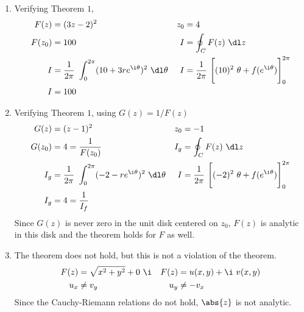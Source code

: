\begin{enumerate}
    \item Verifying Theorem $ 1 $,
          \begin{align}
              F(z)   & = (3z - 2)^2                                              &
              z_0    & = 4                                                         \\
              F(z_0) & = 100                                                     &
              I      & = \oint_C F(z)\ \dl z                                       \\
              I      & = \frac{1}{2\pi}\ \int_{0}^{2\pi}
              (10 + 3re^{\i \theta})^2\ \dl \theta
                     &
              I      & = \frac{1}{2\pi}\ \Bigg[ (10)^2\ \theta + f(e^{\i\theta})
              \Bigg]_0^{2\pi}                                                      \\
              I      & = 100
          \end{align}

    \item Verifying Theorem $ 1 $, using $ G(z)  = 1/F(z)$
          \begin{align}
              G(z)   & = (z - 1)^2                                               &
              z_0    & = -1                                                        \\
              G(z_0) & = 4 = \frac{1}{F(z_0)}                                    &
              I_g    & = \oint_C F(z)\ \dl z                                       \\
              I_g    & = \frac{1}{2\pi}\ \int_{0}^{2\pi}
              (-2 - re^{\i \theta})^{2}\ \dl \theta
                     &
              I      & = \frac{1}{2\pi}\ \Bigg[ (-2)^2\ \theta + f(e^{\i\theta})
              \Bigg]_0^{2\pi}                                                      \\
              I_g    & = 4 = \frac{1}{I_f}
          \end{align}
          Since $ G(z) $ is never zero in the unit disk centered on $ z_0 $,
          $ F(z) $ is analytic in this disk and the theorem holds for $ F $ as well.

    \item The theorem does not hold, but this is not a violation of the theorem.
          \begin{align}
              F(z) & = \sqrt{x^2 + y^2} + 0\ \i &
              F(z) & = u(x, y) + \i\ v(x, y)                      \\
              u_x  & \neq v_y                   & u_y & \neq -v_x
          \end{align}
          Since the Cauchy-Riemann relations do not hold, $ \abs{z} $ is not analytic.


\end{enumerate}
